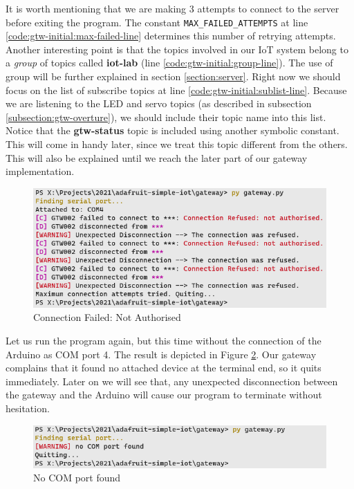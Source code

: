 It is worth mentioning that we are making 3 attempts to connect to the server before exiting the program. The constant \texttt{MAX\_FAILED\_ATTEMPTS} at line \ref{code:gtw-initial:max-failed-line} determines this number of retrying attempts. Another interesting point is that the topics involved in our IoT system belong to a \textit{group} of topics called \textbf{iot-lab} (line \ref{code:gtw-initial:group-line}). The use of group will be further explained in section \ref{section:server}. Right now we should focus on the list of subscribe topics at line \ref{code:gtw-initial:sublist-line}. Because we are listening to the LED and servo topics (as described in subsection \ref{subsection:gtw-overture}), we should include their topic name into this list. Notice that the \textbf{gtw-status} topic is included using another symbolic constant. This will come in handy later, since we treat this topic different from the others. This will also be explained until we reach the later part of our gateway implementation.

\begin{figure}
    \centering
    \includegraphics[scale=0.8]{screenshots/connection_failed.png}
    \caption{Connection Failed: Not Authorised}
    \label{fig:gtw-connection-failed}
\end{figure}

Let us run the program again, but this time without the connection of the Arduino as COM port 4. The result is depicted in Figure \ref{fig:gtw-no-com}. Our gateway complains that it found no attached device at the terminal end, so it quits immediately. Later on we will see that, any unexpected disconnection between the gateway and the Arduino will cause our program to terminate without hesitation.

\begin{figure}
    \centering
    \includegraphics[scale=0.8]{screenshots/no_com.png}
    \caption{No COM port found}
    \label{fig:gtw-no-com}
\end{figure}

